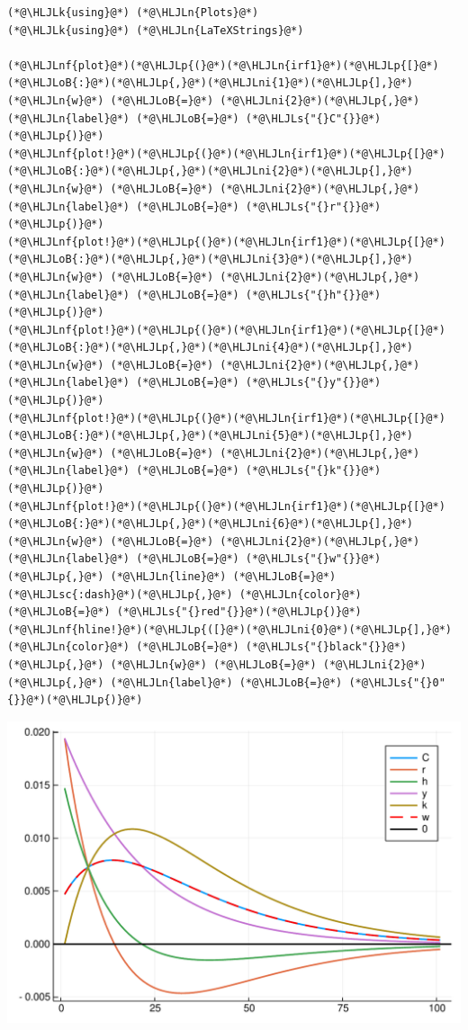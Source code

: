 \documentclass[12pt,a4paper]{article}
\newcommand{\HLJLk}[1]{\textcolor[RGB]{148,91,176}{\textbf{#1}}}
\newcommand{\HLJLn}[1]{#1}
\newcommand{\HLJLnf}[1]{\textcolor[RGB]{66,102,213}{#1}}
\newcommand{\HLJLs}[1]{\textcolor[RGB]{201,61,57}{#1}}
\newcommand{\HLJLsc}[1]{\textcolor[RGB]{201,61,57}{#1}}
\newcommand{\HLJLni}[1]{\textcolor[RGB]{59,151,46}{#1}}
\newcommand{\HLJLoB}[1]{\textcolor[RGB]{102,102,102}{\textbf{#1}}}
\newcommand{\HLJLp}[1]{#1}
\begin{document}
\begin{lstlisting}
(*@\HLJLk{using}@*) (*@\HLJLn{Plots}@*)
(*@\HLJLk{using}@*) (*@\HLJLn{LaTeXStrings}@*)

(*@\HLJLnf{plot}@*)(*@\HLJLp{(}@*)(*@\HLJLn{irf1}@*)(*@\HLJLp{[}@*)(*@\HLJLoB{:}@*)(*@\HLJLp{,}@*)(*@\HLJLni{1}@*)(*@\HLJLp{],}@*) (*@\HLJLn{w}@*) (*@\HLJLoB{=}@*) (*@\HLJLni{2}@*)(*@\HLJLp{,}@*) (*@\HLJLn{label}@*) (*@\HLJLoB{=}@*) (*@\HLJLs{"{}C"{}}@*)(*@\HLJLp{)}@*)
(*@\HLJLnf{plot!}@*)(*@\HLJLp{(}@*)(*@\HLJLn{irf1}@*)(*@\HLJLp{[}@*)(*@\HLJLoB{:}@*)(*@\HLJLp{,}@*)(*@\HLJLni{2}@*)(*@\HLJLp{],}@*) (*@\HLJLn{w}@*) (*@\HLJLoB{=}@*) (*@\HLJLni{2}@*)(*@\HLJLp{,}@*) (*@\HLJLn{label}@*) (*@\HLJLoB{=}@*) (*@\HLJLs{"{}r"{}}@*)(*@\HLJLp{)}@*)
(*@\HLJLnf{plot!}@*)(*@\HLJLp{(}@*)(*@\HLJLn{irf1}@*)(*@\HLJLp{[}@*)(*@\HLJLoB{:}@*)(*@\HLJLp{,}@*)(*@\HLJLni{3}@*)(*@\HLJLp{],}@*) (*@\HLJLn{w}@*) (*@\HLJLoB{=}@*) (*@\HLJLni{2}@*)(*@\HLJLp{,}@*) (*@\HLJLn{label}@*) (*@\HLJLoB{=}@*) (*@\HLJLs{"{}h"{}}@*)(*@\HLJLp{)}@*)
(*@\HLJLnf{plot!}@*)(*@\HLJLp{(}@*)(*@\HLJLn{irf1}@*)(*@\HLJLp{[}@*)(*@\HLJLoB{:}@*)(*@\HLJLp{,}@*)(*@\HLJLni{4}@*)(*@\HLJLp{],}@*) (*@\HLJLn{w}@*) (*@\HLJLoB{=}@*) (*@\HLJLni{2}@*)(*@\HLJLp{,}@*) (*@\HLJLn{label}@*) (*@\HLJLoB{=}@*) (*@\HLJLs{"{}y"{}}@*)(*@\HLJLp{)}@*)
(*@\HLJLnf{plot!}@*)(*@\HLJLp{(}@*)(*@\HLJLn{irf1}@*)(*@\HLJLp{[}@*)(*@\HLJLoB{:}@*)(*@\HLJLp{,}@*)(*@\HLJLni{5}@*)(*@\HLJLp{],}@*) (*@\HLJLn{w}@*) (*@\HLJLoB{=}@*) (*@\HLJLni{2}@*)(*@\HLJLp{,}@*) (*@\HLJLn{label}@*) (*@\HLJLoB{=}@*) (*@\HLJLs{"{}k"{}}@*)(*@\HLJLp{)}@*)
(*@\HLJLnf{plot!}@*)(*@\HLJLp{(}@*)(*@\HLJLn{irf1}@*)(*@\HLJLp{[}@*)(*@\HLJLoB{:}@*)(*@\HLJLp{,}@*)(*@\HLJLni{6}@*)(*@\HLJLp{],}@*) (*@\HLJLn{w}@*) (*@\HLJLoB{=}@*) (*@\HLJLni{2}@*)(*@\HLJLp{,}@*) (*@\HLJLn{label}@*) (*@\HLJLoB{=}@*) (*@\HLJLs{"{}w"{}}@*)(*@\HLJLp{,}@*) (*@\HLJLn{line}@*) (*@\HLJLoB{=}@*) (*@\HLJLsc{:dash}@*)(*@\HLJLp{,}@*) (*@\HLJLn{color}@*) (*@\HLJLoB{=}@*) (*@\HLJLs{"{}red"{}}@*)(*@\HLJLp{)}@*)
(*@\HLJLnf{hline!}@*)(*@\HLJLp{([}@*)(*@\HLJLni{0}@*)(*@\HLJLp{],}@*) (*@\HLJLn{color}@*) (*@\HLJLoB{=}@*) (*@\HLJLs{"{}black"{}}@*)(*@\HLJLp{,}@*) (*@\HLJLn{w}@*) (*@\HLJLoB{=}@*) (*@\HLJLni{2}@*)(*@\HLJLp{,}@*) (*@\HLJLn{label}@*) (*@\HLJLoB{=}@*) (*@\HLJLs{"{}0"{}}@*)(*@\HLJLp{)}@*)
\end{lstlisting}

\includegraphics[width=\linewidth]{figures/yvan_3_1.pdf}
\end{document}

